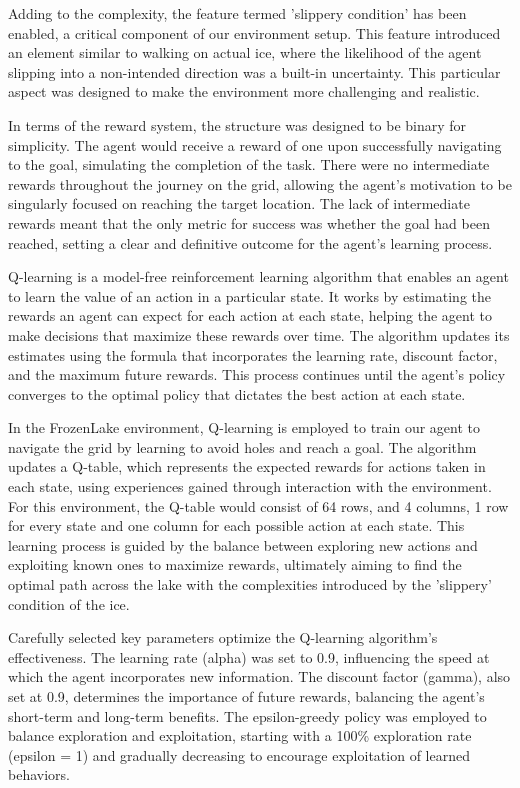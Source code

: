 \documentclass[10pt,twocolumn]{article}
\begin{document}
    
    Adding to the complexity, the feature termed 'slippery condition' has been enabled, a critical component of our environment setup. This feature introduced an element similar to walking on actual ice, where the likelihood of the agent slipping into a non-intended direction was a built-in uncertainty. This particular aspect was designed to make the environment more challenging and realistic.

    In terms of the reward system, the structure was designed to be binary for simplicity. The agent would receive a reward of one upon successfully navigating to the goal, simulating the completion of the task. There were no intermediate rewards throughout the journey on the grid, allowing the agent's motivation to be singularly focused on reaching the target location. The lack of intermediate rewards meant that the only metric for success was whether the goal had been reached, setting a clear and definitive outcome for the agent's learning process.
    
    
    Q-learning is a model-free reinforcement learning algorithm that enables an agent to learn the value of an action in a particular state. It works by estimating the rewards an agent can expect for each action at each state, helping the agent to make decisions that maximize these rewards over time. The algorithm updates its estimates using the formula that incorporates the learning rate, discount factor, and the maximum future rewards. This process continues until the agent's policy converges to the optimal policy that dictates the best action at each state.

    
    In the FrozenLake environment, Q-learning is employed to train our agent to navigate the grid by learning to avoid holes and reach a goal. The algorithm updates a Q-table, which represents the expected rewards for actions taken in each state, using experiences gained through interaction with the environment. For this environment, the Q-table would consist of 64 rows, and 4 columns, 1 row for every state and one column for each possible action at each state. This learning process is guided by the balance between exploring new actions and exploiting known ones to maximize rewards, ultimately aiming to find the optimal path across the lake with the complexities introduced by the 'slippery' condition of the ice.

    Carefully selected key parameters optimize the Q-learning algorithm's effectiveness. The learning rate (alpha) was set to 0.9, influencing the speed at which the agent incorporates new information. The discount factor (gamma), also set at 0.9, determines the importance of future rewards, balancing the agent's short-term and long-term benefits. The epsilon-greedy policy was employed to balance exploration and exploitation, starting with a 100\% exploration rate (epsilon = 1) and gradually decreasing to encourage exploitation of learned behaviors.
\end{document}
